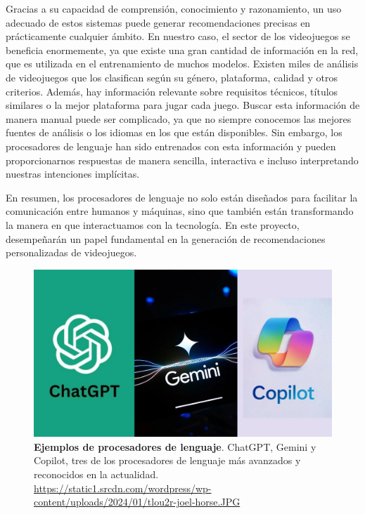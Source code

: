 Gracias a su capacidad de comprensión, conocimiento y razonamiento, un uso adecuado de estos sistemas puede generar recomendaciones precisas en prácticamente cualquier ámbito. En nuestro caso, el sector de los videojuegos se beneficia enormemente, ya que existe una gran cantidad de información en la red, que es utilizada en el entrenamiento de muchos modelos. Existen miles de análisis de videojuegos que los clasifican según su género, plataforma, calidad y otros criterios. Además, hay información relevante sobre requisitos técnicos, títulos similares o la mejor plataforma para jugar cada juego. Buscar esta información de manera manual puede ser complicado, ya que no siempre conocemos las mejores fuentes de análisis o los idiomas en los que están disponibles. Sin embargo, los procesadores de lenguaje han sido entrenados con esta información y pueden proporcionarnos respuestas de manera sencilla, interactiva e incluso interpretando nuestras intenciones implícitas.

En resumen, los procesadores de lenguaje no solo están diseñados para facilitar la comunicación entre humanos y máquinas, sino que también están transformando la manera en que interactuamos con la tecnología. En este proyecto, desempeñarán un papel fundamental en la generación de recomendaciones personalizadas de videojuegos.

\begin{figure}[H]
    \centering
    \includegraphics[width=1\linewidth]{imagenes/pdl.jpg}
    \caption[\textbf{Ejemplos de procesadores de lenguaje}.]{\textbf{Ejemplos de procesadores de lenguaje}. ChatGPT, Gemini y Copilot, tres de los procesadores de lenguaje más avanzados y reconocidos en la actualidad. \href{https://static1.srcdn.com/wordpress/wp-content/uploads/2024/01/tlou2r-joel-horse.JPG}{https://static1.srcdn.com/wordpress/wp-content/uploads/2024/01/tlou2r-joel-horse.JPG}}
    \label{procesadores-de-lenguaje}
\end{figure}

